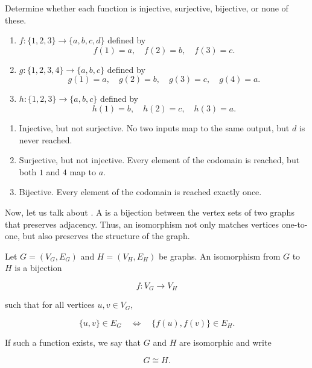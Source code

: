 \begin{Exercise}[title={Bijective, Surjective, Injective Exercise}, label={ex:bi_sur_in}]
	Determine whether each function is injective, surjective, bijective, or none of these.

	\begin{enumerate}
		\item $f:\{1,2,3\}\rightarrow\{a,b,c,d\}$ defined by
		      \[
			      f(1)=a,\quad f(2)=b,\quad f(3)=c.
		      \]

		\item $g:\{1,2,3,4\}\rightarrow\{a,b,c\}$ defined by
		      \[
			      g(1)=a,\quad g(2)=b,\quad g(3)=c,\quad g(4)=a.
		      \]

		\item $h:\{1,2,3\}\rightarrow\{a,b,c\}$ defined by
		      \[
			      h(1)=b,\quad h(2)=c,\quad h(3)=a.
		      \]
	\end{enumerate}
\end{Exercise}

\begin{Answer}[ref={ex:bi_sur_in}]
	\begin{enumerate}
		\item Injective, but not surjective. No two inputs map to the same output, but $d$ is never reached.

		\item Surjective, but not injective. Every element of the codomain is reached, but both $1$ and $4$ map to $a$.

		\item Bijective. Every element of the codomain is reached exactly once.
	\end{enumerate}
\end{Answer}
Now, let us talk about . A  is a bijection between the vertex sets of two graphs that preserves adjacency. Thus, an isomorphism not only matches vertices one-to-one, but also preserves the structure of the graph.

\begin{definition}
	Let $G=(V_G,E_G)$ and $H=(V_H,E_H)$ be graphs. An isomorphism from $G$ to $H$ is a bijection

	\[
		f : V_G \to V_H
	\]

	such that for all vertices $u,v \in V_G$,

	\[
		\{u,v\}\in E_G
		\quad\iff\quad
		\{f(u),f(v)\}\in E_H.
	\]

	If such a function exists, we say that $G$ and $H$ are isomorphic and write

	\[
		G \cong H.
	\]
\end{definition}

